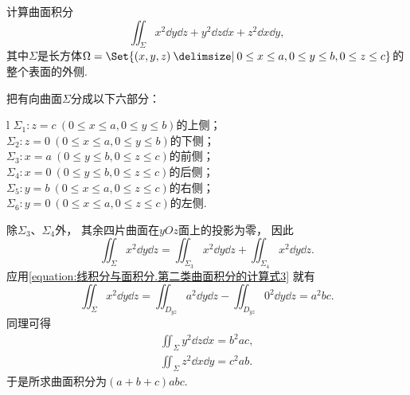 \begin{example}
计算曲面积分\begin{equation*}
	\iint_\Sigma x^2 \dd{y}\dd{z} + y^2 \dd{z}\dd{x} + z^2 \dd{x}\dd{y},
\end{equation*}
其中\(\Sigma\)是长方体\(\Omega = \Set{
	(x,y,z)
	\given
	0 \leq x \leq a,
	0 \leq y \leq b,
	0 \leq z \leq c
}\)的整个表面的外侧.
\begin{solution}
把有向曲面\(\Sigma\)分成以下六部分：
\begin{center}
	\begin{tblr}{l}
		\(\Sigma_1: z=c\ (0 \leq x \leq a, 0 \leq y \leq b)\)的上侧； \\
		\(\Sigma_2: z=0\ (0 \leq x \leq a, 0 \leq y \leq b)\)的下侧； \\
		\(\Sigma_3: x=a\ (0 \leq y \leq b, 0 \leq z \leq c)\)的前侧； \\
		\(\Sigma_4: x=0\ (0 \leq y \leq b, 0 \leq z \leq c)\)的后侧； \\
		\(\Sigma_5: y=b\ (0 \leq x \leq a, 0 \leq z \leq c)\)的右侧； \\
		\(\Sigma_6: y=0\ (0 \leq x \leq a, 0 \leq z \leq c)\)的左侧. \\
	\end{tblr}
\end{center}
除\(\Sigma_3\)、\(\Sigma_4\)外，
其余四片曲面在\(yOz\)面上的投影为零，
因此\begin{equation*}
	\iint_\Sigma x^2 \dd{y}\dd{z}
	= \iint_{\Sigma_3} x^2 \dd{y}\dd{z}
	+ \iint_{\Sigma_4} x^2 \dd{y}\dd{z}.
\end{equation*}
应用\cref{equation:线积分与面积分.第二类曲面积分的计算式3} 就有\begin{equation*}
	\iint_\Sigma x^2 \dd{y}\dd{z}
	= \iint_{D_{yz}} a^2 \dd{y}\dd{z}
	- \iint_{D_{yz}} 0^2 \dd{y}\dd{z}
	= a^2 bc.
\end{equation*}
同理可得\begin{gather*}
	\iint_\Sigma y^2 \dd{z}\dd{x}
	= b^2 ac, \\
	\iint_\Sigma z^2 \dd{x}\dd{y}
	= c^2 ab.
\end{gather*}
于是所求曲面积分为\((a+b+c) abc\).
\end{solution}
\end{example}


